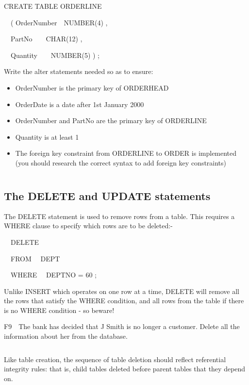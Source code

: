  CREATE TABLE ORDERLINE

\ \ ( OrderNumber\ \ NUMBER(4) ,

\ \   PartNo\ \ \ \ CHAR(12) ,

\ \   Quantity\ \ \ \ NUMBER(5) ) ;

Write the alter statements needed so as to ensure:

\begin{itemize}
\item OrderNumber is the primary key of ORDERHEAD
\item OrderDate is a date after 1st January 2000
\item OrderNumber and PartNo are the primary key of ORDERLINE
\item Quantity is at least 1
\item The foreign key constraint from ORDERLINE to ORDER is implemented (you should research the correct syntax to add foreign key constraints) 
\end{itemize}
\begin{flushleft}
\tablefirsthead{}
\tablehead{}
\tabletail{}
\tablelasttail{}
\begin{supertabular}{|m{14.663cm}|}
\hline
\\\hline
\end{supertabular}
\end{flushleft}
\subsection{The DELETE and UPDATE statements}
The DELETE statement is used to remove rows from a table.  This requires a WHERE clause to specify which rows are to be deleted:-

\ \ DELETE 

\ \ FROM \ \ DEPT

\ \ WHERE \ \ DEPTNO = 60 ;

Unlike INSERT which operates on one row at a time, DELETE will remove all the rows that satisfy the WHERE condition, and all rows from the table if there is no WHERE condition - so beware!

F9\ \ The bank has decided that J Smith is no longer a customer.  Delete all the information about her from the database.

\begin{flushleft}
\tablefirsthead{}
\tablehead{}
\tabletail{}
\tablelasttail{}
\begin{supertabular}{|m{14.663cm}|}
\hline
\\\hline
\end{supertabular}
\end{flushleft}
Like table creation, the sequence of table deletion should reflect referential integrity rules: that is, child tables deleted before parent tables that they depend on.

